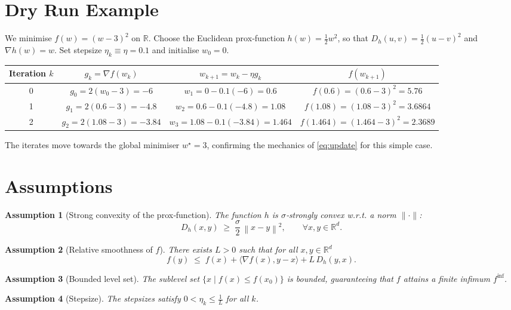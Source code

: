 \documentclass{article}
\newtheorem{assumption}{Assumption}
\newcommand{\norm}[1]{\left\lVert#1\right\rVert}
\newcommand{\inner}[2]{\langle #1,#2\rangle}
\newcommand{\D}[2]{D_{h}(#1,#2)}
\begin{document}
\section*{Dry Run Example}
We minimise $f(w)=(w-3)^{2}$ on $\mathbb{R}$.
Choose the Euclidean prox‑function $h(w)=\frac12 w^{2}$, so that $D_{h}(u,v)=\frac12 (u-v)^{2}$ and $\nabla h(w)=w$.
Set stepsize $\eta_{k}\equiv\eta=0.1$ and initialise $w_{0}=0$.

\bigskip
\begin{tabular}{c|c|c|c}
Iteration $k$ & $g_{k}= \nabla f(w_{k})$ & $w_{k+1}= w_{k}-\eta g_{k}$ & $f(w_{k+1})$\\ \hline
0 & $g_{0}=2(w_{0}-3) = -6$ & $w_{1}=0-0.1(-6)=0.6$ & $f(0.6)= (0.6-3)^{2}=5.76$\\
1 & $g_{1}=2(0.6-3) = -4.8$ & $w_{2}=0.6-0.1(-4.8)=1.08$ & $f(1.08)= (1.08-3)^{2}=3.6864$\\
2 & $g_{2}=2(1.08-3) = -3.84$ & $w_{3}=1.08-0.1(-3.84)=1.464$ & $f(1.464)= (1.464-3)^{2}=2.3689$
\end{tabular}

The iterates move towards the global minimiser $w^{\star}=3$, confirming the mechanics of \eqref{eq:update} for this simple case.

\newpage
\section*{Assumptions}
\begin{assumption}[Strong convexity of the prox‑function]
\label{ass:strong}
The function $h$ is $\sigma$‑strongly convex w.r.t. a norm $\|\cdot\|$:
\[
\D{x}{y}\;\ge\;\frac{\sigma}{2}\,\norm{x-y}^{2},
\qquad\forall x,y\in\mathbb{R}^{d}.
\]
\end{assumption}

\begin{assumption}[Relative smoothness of $f$]
\label{ass:smooth}
There exists $L>0$ such that for all $x,y\in\mathbb{R}^{d}$
\[
f(y)\;\le\;f(x)+\inner{\nabla f(x)}{y-x}+L\,\D{y}{x}.
\]
\end{assumption}

\begin{assumption}[Bounded level set]
\label{ass:bounded}
The sublevel set $\{x\mid f(x)\le f(x_{0})\}$ is bounded, guaranteeing that $f$ attains a finite infimum $f^{\inf}$.
\end{assumption}

\begin{assumption}[Stepsize]
\label{ass:stepsize}
The stepsizes satisfy $0<\eta_{k}\le \frac{1}{L}$ for all $k$.
\end{assumption}
\end{document}
